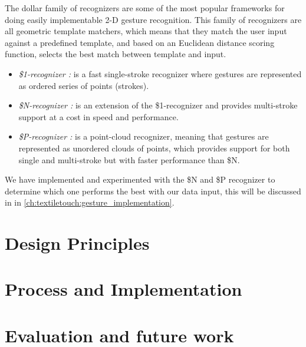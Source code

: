 The dollar family of recognizers \citep{anthony2010lightweight,vatavu2012gestures,wobbrock2007gestures} are some of the most popular frameworks for doing easily implementable 2-D gesture recognition.
This family of recognizers are all geometric template matchers, which means that they match the user input against a predefined template, and based on an Euclidean distance scoring function, selects the best match between template and input.
\begin{itemize}
  \item \emph{\$1-recognizer \citep{wobbrock2007gestures}:} is a fast single-stroke recognizer where gestures are represented as ordered series of points (strokes).
  \item \emph{\$N-recognizer \citep{anthony2010lightweight}:} is an extension of the \$1-recognizer and provides multi-stroke support at a cost in speed and performance.
  \item \emph{\$P-recognizer \citep{vatavu2012gestures}:} is a point-cloud recognizer, meaning that gestures are represented as unordered clouds of points, which provides support for both single and multi-stroke but with faster performance than \$N. 
\end{itemize}
We have implemented and experimented with the \$N and \$P recognizer to determine which one performs the best with our data input, this will be discussed in  in \ref{ch:textiletouch:gesture_implementation}.

\section{Design Principles}


\section{Process and Implementation}


\section{Evaluation and future work}
